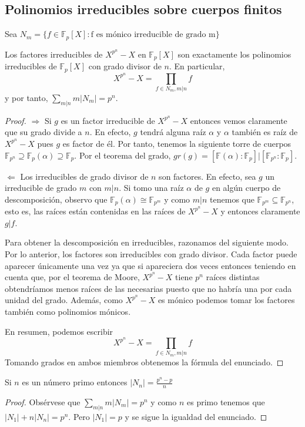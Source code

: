 \subsection{Polinomios irreducibles sobre cuerpos finitos}

Sea $N_m = \{f \in \mathbb{F}_p[X]:\text{f es mónico irreducible de grado m}\}$

\begin{theorem}
	Los factores irreducibles de $X^{p^n} - X$ en $\mathbb{F}_p[X]$ son exactamente los polinomios irreducibles de $\mathbb{F}_p[X]$ con grado divisor de $n$. En particular, $$X^{p^n} - X = \prod_{f \in N_m, m|n} f$$ y por tanto, $\sum_{m|n} m |N_m| = p^n$.
\end{theorem} 
\begin{proof}
$\Rightarrow$ Si $g$ es un factor irreducible de $X^{p^n} - X$ entonces vemos claramente que su grado divide a $n$. En efecto, $g$ tendrá alguna raíz $\alpha$ y $\alpha$ también es raíz de $X^{p^n} - X$ pues $g$ es factor de él. Por tanto, tenemos la siguiente torre de cuerpos $\mathbb{F}_{p^n} \supseteq \mathbb{F}_{p}(\alpha) \supseteq \mathbb{F}_p$. Por el teorema del grado, $gr(g) = [\mathbb{F}(\alpha):\mathbb{F}_p] | [\mathbb{F}_{p^n}:\mathbb{F}_p]$.
	
$\Leftarrow$ Los irreducibles de grado divisor de $n$ son factores. En efecto, sea $g$ un irreducible de grado $m$ con $m|n$. Si tomo una raíz $\alpha$ de $g$ en algún cuerpo de descomposición, observo que $\mathbb{F}_p(\alpha) \cong \mathbb{F}_{p^m}$ y como $m|n$ tenemos que $\mathbb{F}_{p^m} \subseteq \mathbb{F}_{p^n}$, esto es, las raíces están contenidas en las raíces de $X^{p^n} - X$ y entonces claramente $g|f$. 
	
Para obtener la descomposición en irreducibles, razonamos del siguiente modo. Por lo anterior, los factores son irreducibles con grado divisor. Cada factor puede aparecer únicamente una vez ya que si apareciera dos veces entonces teniendo en cuenta que, por el teorema de Moore, $X^{p^n}-X$ tiene $p^n$ raíces distintas obtendríamos menos raíces de las necesarias puesto que no habría una por cada unidad del grado. Además, como $X^{p^n}-X$ es mónico podemos tomar los factores también como polinomios mónicos. 
	
En resumen, podemos escribir $$X^{p^n} - X = \prod_{f \in N_m, m|n} f$$ Tomando grados en ambos miembros obtenemos la fórmula del enunciado. 
\end{proof}

\begin{corollary}
	Si $n$ es un número primo entonces $|N_n| = \frac{p^n-p}{n}$
\end{corollary}
\begin{proof}
	Obsérvese que $\sum_{m|n} m |N_m| = p^n$ y como $n$ es primo tenemos que $|N_1| + n|N_n| = p^n$. Pero $|N_1| = p$ y se sigue la igualdad del enunciado. 
\end{proof}

